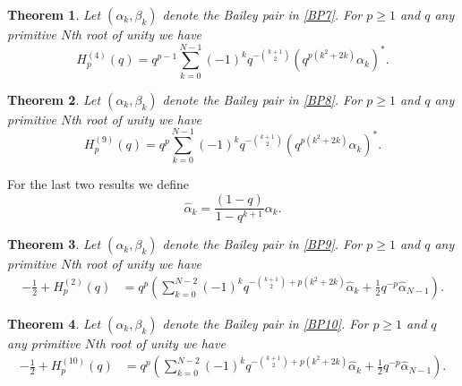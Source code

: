 \documentclass[11pt,reqno]{amsart}
\newtheorem{theorem}{Theorem}[section]
\theoremstyle{definition}
\numberwithin{equation}{section}
\renewcommand{\=}{\;=\;}
\begin{document}
\begin{theorem} \label{Baileyfamily7}
	Let $(\alpha_k,\beta_k)$ denote the Bailey pair in \eqref{BP7}.   For $p \geq 1$ and $q$ any primitive $N$th root of unity we have
	\begin{equation} \label{Baileyfamily7eq}
		H_p^{(4)}(q)  = q^{p-1}\sum_{k=0}^{N-1} (-1)^k q^{-\binom{k+1}{2}} (q^{p(k^2+2k)} \alpha_k)^*.
	\end{equation}
\end{theorem} 

\begin{theorem} \label{Baileyfamily8}
	Let $(\alpha_k,\beta_k)$ denote the Bailey pair in \eqref{BP8}.   For $p \geq 1$ and $q$ any primitive $N$th root of unity we have
	\begin{equation} \label{Baileyfamily8eq}
		H_p^{(9)}(q) = q^{p}\sum_{k=0}^{N-1} (-1)^k q^{-\binom{k+1}{2}} (q^{p(k^2+2k)} \alpha_k)^*.
	\end{equation}
\end{theorem}
For the last two results we define
\begin{equation} \label{alphatilde}
\widehat{\alpha}_k = \frac{(1-q)}{1-q^{k+1}}\alpha_k.
\end{equation}

\begin{theorem} \label{Baileyfamily9}
	Let $(\alpha_k,\beta_k)$ denote the Bailey pair in \eqref{BP9}.  For $p \geq 1$ and $q$ any primitive $N$th root of unity we have
	\begin{equation} \label{Baileyfamily9eq}
		\begin{aligned}
			-\frac{1}{2} + H_p^{(2)}(q)
			&= q^{p}\left(\sum_{k=0}^{N-2} (-1)^{k} q^{-\binom{k+1}{2} + p(k^2+2k)} \widehat{\alpha}_k + \frac{1}{2} q^{-p}\widehat{\alpha}_{N-1}\right).
		\end{aligned}
	\end{equation}
\end{theorem}

\begin{theorem} \label{Baileyfamily10}
	Let $(\alpha_k,\beta_k)$ denote the Bailey pair in \eqref{BP10}.  For $p \geq 1$ and $q$ any primitive $N$th root of unity we have
	\begin{equation} \label{Baileyfamily10eq}
		\begin{aligned}
			-\frac{1}{2} + H_p^{(10)}(q)
			&= q^{p}\left(\sum_{k=0}^{N-2} (-1)^{k} q^{-\binom{k+1}{2} + p(k^2+2k)} \widehat{\alpha}_k + \frac{1}{2} q^{-p}\widehat{\alpha}_{N-1}\right).
		\end{aligned}
	\end{equation}
\end{theorem}
\end{document}
